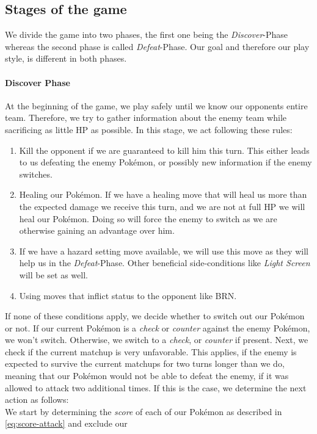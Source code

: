 \subsection{Stages of the game}
We divide the game into two phases, the first one being the \textit{Discover}-Phase whereas the second phase is called
\textit{Defeat}-Phase. Our goal and therefore our play style, is different in both phases.
\paragraph{Discover Phase}
At the beginning of the game, we play safely until we know our opponents entire team. Therefore, we try to gather 
information about the enemy team while sacrificing as little \ac{HP} as possible. In this stage, we act following
these rules:
\begin{enumerate}
	\item Kill the opponent if we are guaranteed to kill him this turn. This either leads to us defeating the 
	enemy Pokémon, or possibly new information if the enemy switches.
	\item Healing our Pokémon. If we have a healing move that will heal us more than the expected damage we receive
	this turn, and we are not at full \ac{HP} we will heal our Pokémon. Doing so will force the enemy to switch as
	we are otherwise gaining an advantage over him.
	\item If we have a hazard setting move available, we will use this move as they will help us in the \textit{Defeat}-Phase.
	Other beneficial side-conditions like \textit{Light Screen} will be set as well. 
	\item Using moves that inflict status to the opponent like \ac{BRN}.
\end{enumerate}
If none of these conditions apply, we decide whether to switch out our Pokémon or not. If our current Pokémon is a 
\textit{check} or \textit{counter} against the enemy Pokémon, we won't switch. Otherwise, we switch to a \textit{check},
or \textit{counter} if present. Next, we check if the current matchup is very unfavorable. This applies, if the enemy
is expected to survive the current matchups for two turns longer than we do, meaning that our Pokémon would not be able
to defeat the enemy, if it was allowed to attack two additional times. If this is the case, we determine the next action
as follows: \\
We start by determining the \textit{score} of each of our Pokémon as described in \ref{eq:score-attack} and exclude our
